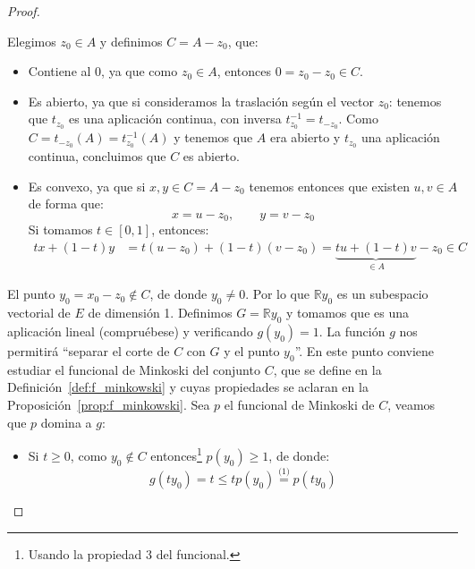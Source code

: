 \begin{teo}
\begin{proof}
\begin{description}
                Elegimos $z_0\in A$ y definimos $C = A-z_0$, que:
                \begin{itemize}
                    \item Contiene al $0$, ya que como $z_0 \in A$, entonces $0=z_0-z_0\in C$.
                    \item Es abierto, ya que si consideramos la traslación según el vector $z_0$:
                        tenemos que $t_{z_0}$ es una aplicación continua, con inversa $t^{-1}_{z_0}=t_{-z_0}$. Como $C = t_{-z_0}(A) = t^{-1}_{z_0}(A)$ y tenemos que $A$ era abierto y $t_{z_0}$ una aplicación continua, concluimos que $C$ es abierto.
                    \item Es convexo, ya que si $x,y\in C=A-z_0$ tenemos entonces que existen $u,v\in A$ de forma que:
                        \begin{equation*}
                            x = u-z_0, \qquad y = v-z_0
                        \end{equation*}
                        Si tomamos $t\in [0,1]$, entonces:
                        \begin{align*}
                            tx + (1-t)y &= t(u-z_0) + (1-t)(v-z_0) = \underbrace{tu + (1-t)v}_{\in A} - z_0 \in C
                        \end{align*}
                \end{itemize}
                El punto $y_0 = x_ 0 - z_0\notin C$, de donde $y_0 \neq 0$. Por lo que $\mathbb{R}y_0$ es un subespacio vectorial de $E$ de dimensión 1. Definimos $G = \mathbb{R} y_0$ y tomamos 
            que es una aplicación lineal (compruébese) y verificando $g(y_0) = 1$. La función $g$ nos permitirá ``separar el corte de $C$ con $G$ y el punto $y_0$''. En este punto conviene estudiar el funcional de Minkoski del conjunto $C$, que se define en la Definición~\ref{def:f_minkowski} y cuyas propiedades se aclaran en la Proposición~\ref{prop:f_minkowski}. Sea $p$ el funcional de Minkoski de $C$, veamos que $p$ domina a $g$:
                \begin{itemize}
                    \item Si $t\geq 0$, como $y_0\notin C$ entonces\footnote{Usando la propiedad 3 del funcional.} $p(y_0) \geq 1$, de donde:
                        \begin{equation*}
                            g(ty_0) = t \leq tp(y_0) \stackrel{\text{(1)}}{=} p(ty_0)
                        \end{equation*}

\end{itemize}
\end{description}
\end{proof}
\end{teo}
